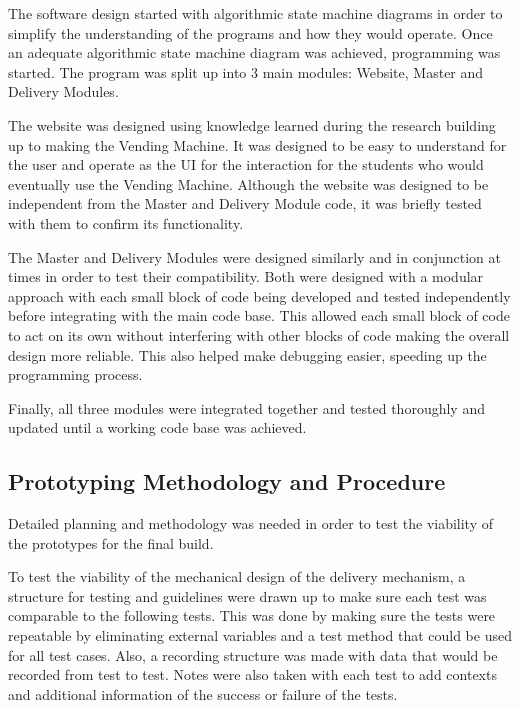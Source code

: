\documentclass[a4paper,11pt]{article}
\numberwithin{figure}{section}
\numberwithin{table}{section}
\begin{document}
The software design started with algorithmic state machine diagrams in order to simplify the understanding of the programs and how they would operate. Once an adequate algorithmic state machine diagram was achieved, programming was started. The program was split up into 3 main modules: Website, Master and Delivery Modules. 

The website was designed using knowledge learned during the research building up to making the Vending Machine. It was designed to be easy to understand for the user and operate as the UI for the interaction for the students who would eventually use the Vending Machine. Although the website was designed to be independent from the Master and Delivery Module code, it was briefly tested with them to confirm its functionality.

The Master and Delivery Modules were designed similarly and in conjunction at times in order to test their compatibility. Both were designed with a modular approach with each small block of code being developed and tested independently before integrating with the main code base. This allowed each small block of code to act on its own without interfering with other blocks of code making the overall design more reliable. This also helped make debugging easier, speeding up the programming process.

Finally, all three modules were integrated together and tested thoroughly and updated until a working code base was achieved. 

\subsection[Prototyping Methodology and Procedure]{Prototyping Methodology and Procedure%
}

Detailed planning and methodology was needed in order to test the viability of the prototypes for the final build.

To test the viability of the mechanical design of the delivery mechanism, a structure for testing and guidelines were drawn up to make sure each test was comparable to the following tests. This was done by making sure the tests were repeatable by eliminating external variables and a test method that could be used for all test cases. Also, a recording structure was made with data that would be recorded from test to test. Notes were also taken with each test to add contexts and additional information of the success or failure of the tests.
\end{document}
